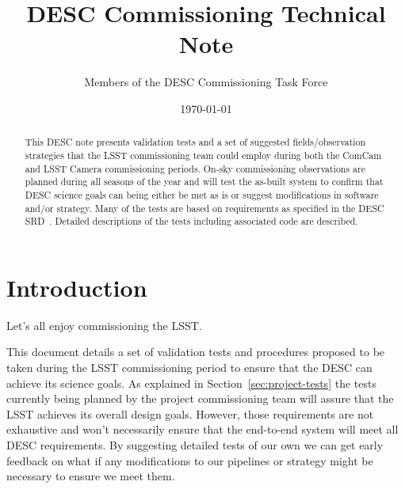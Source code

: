 \documentclass[modern]{desc-tex/styles/lsstdescnote}
\begin{document}
\title{DESC Commissioning Technical Note}
\author{Members of the DESC Commissioning Task Force}
\date{\today}

\begin{abstract}

  This DESC note presents validation tests and a set of suggested fields/observation strategies that the LSST commissioning team could employ during both the ComCam and LSST Camera commissioning periods.  On-sky commissioning observations are planned during all seasons of the year and will test the as-built system to confirm that DESC science goals can being either be met as is or suggest modifications in software and/or strategy.  Many of the tests are based on requirements as specified in the DESC SRD~\cite{DESC-SRD}.  Detailed descriptions of the tests including associated code are described.  
  
 \end{abstract}

\maketitle

\noindent
\begin{center}
  \fboxsep=5pt  
 \end{center} 
\vspace{0.1in}

\section{Introduction}

Let's all enjoy commissioning the LSST.

This document details a set of validation tests and procedures proposed to be taken during the LSST commissioning period to ensure that the DESC can achieve its science goals.  As explained in Section~\ref{sec:project-tests} the tests currently being planned by the project commissioning team will assure that the LSST achieves its overall design goals. However, those requirements are not exhaustive and won't necessarily ensure that the end-to-end system will meet all DESC requirements.  By suggesting detailed tests of our own we can get early feedback on what if any modifications to our pipelines or strategy might be necessary to ensure we meet them.
\end{document}
